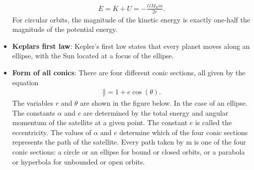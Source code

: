 \documentclass{report}
\begin{document}
\begin{itemize}
            \begin{align*}
               E = K + U = -\frac{GM_{E}m}{2r} 
            .\end{align*}
            \bigbreak \noindent 
            For circular orbits, the magnitude of the kinetic energy is exactly one-half the magnitude of the potential energy.
        \item \textbf{Keplars first law}: Kepler’s first law states that every planet moves along an ellipse, with the Sun located at a focus of the ellipse.
        \item \textbf{Form of all conics}: There are four different conic sections, all given by the equation
            \begin{align*}
                \frac{a}{r} = 1+e\cos{\left(\theta \right)}
            .\end{align*}
            \bigbreak \noindent 
            The variables $r$ and $\theta$ are shown in the figure below. In the case of an ellipse. The constants $\alpha$ and $e$ are determined by the total energy and angular momentum of the satellite at a given point. The constant $e$ is called the eccentricity. The values of $\alpha$ and $e$ determine which of the four conic sections represents the path of the satellite.
            \bigbreak \noindent 
            \bigbreak \noindent 
            Every path taken by m is one of the four conic sections: a circle or an ellipse for bound or closed orbits, or a parabola or hyperbola for unbounded or open orbits.



\end{itemize}
\end{document}
